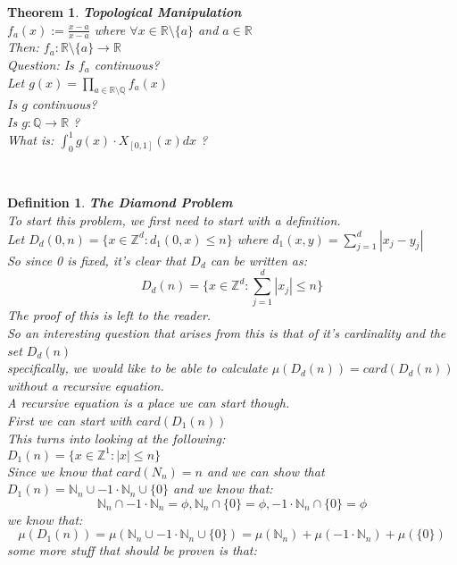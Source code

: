\documentclass[12pt]{extarticle}
\theoremstyle{plain}
\newtheorem{thm}{Theorem}[section]
\theoremstyle{plain}
\theoremstyle{plain}
\theoremstyle{Definition}
\newtheorem{def.}{Definition}[section]
\theoremstyle{Definition}
\theoremstyle{plain}
\theoremstyle{plain}
\newcommand{\cut}[0]{\noindent\framebox[\linewidth]{\rule{\linewidth}{2pt}}\\}
\begin{document}
\begin{thm} \textbf{Topological Manipulation} \\
	$f_a(x) := \frac{x - a}{x - a}$ where $\forall x \in \mathbb{R} \setminus \{a\}$ and $a \in \mathbb{R}$ \\ 
	Then: $f_a : \mathbb{R} \setminus \{a\} \to \mathbb{R}$ \\ 
	Question: Is $f_a$ continuous? \\ 
	Let $g(x) = \prod_{a \in \mathbb{R} \setminus \mathbb{Q} } f_a(x)$ \\ 
	Is $g$ continuous? \\
	Is $g : \mathbb{Q} \to \mathbb{R}$ ? \\
	What is: $\int_{0}^1 g(x) \cdot X_{[0,1]}(x) dx$ ?
\end{thm}
\cut 
\begin{def.} \textbf{The Diamond Problem} \\ 
	To start this problem, we first need to start with a definition. \\ 
	Let $D_d(0,n) = \{x \in \mathbb{Z}^d : d_1(0,x) \leq n\}$ 
	where $d_1(x,y) = \sum_{j=1}^{d} |x_j-y_j|$ \\
	So since 0 is fixed, it's clear that $D_d$ can be written as: \\ 
	$$D_d(n) = \{x \in \mathbb{Z}^d : \sum_{j=1}^{d} |x_j| \leq n\}$$
	The proof of this is left to the reader. \\ 
	So an interesting question that arises from this is that of it's cardinality and the set $D_d(n)$ \\ 
	specifically, we would like to be able to calculate $\mu(D_d(n)) = card(D_d(n))$ without a recursive equation. \\ 
	A recursive equation is a place we can start though. \\ 
	First we can start with $card(D_1(n))$ \\ 
	This turns into looking at the following: \\ 
	$D_1(n) = \{x \in \mathbb{Z}^1 : |x| \leq n\}$ \\ 
	Since we know that $card(N_n) = n$ and we can show that $D_1(n) = \mathbb{N}_n \cup -1\cdot\mathbb{N}_n  \cup \{0\}$ and we know that: 
	$$\mathbb{N}_n \cap -1\cdot\mathbb{N}_n = \phi, \mathbb{N}_n \cap \{0\} = \phi, -1\cdot\mathbb{N}_n \cap \{0\} = \phi$$
	we know that: \\
	$$\mu(D_1(n)) = \mu(\mathbb{N}_n \cup -1\cdot\mathbb{N}_n  \cup \{0\}) = \mu(\mathbb{N}_n) + \mu(-1\cdot\mathbb{N}_n) + \mu(\{0\})$$
	some more stuff that should be proven is that: \\ 

\end{def.}
\end{document}
